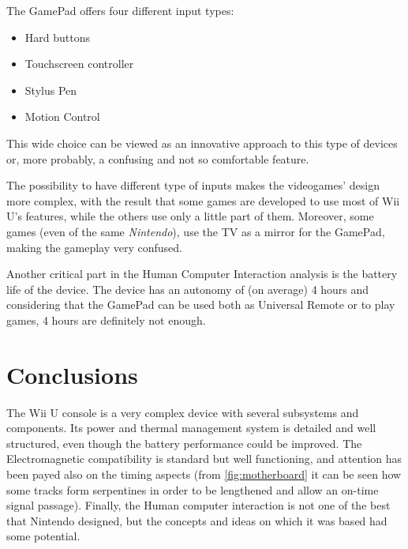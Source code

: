 \documentclass[11pt,a4paper,titlepage]{article}
\begin{document}
			The GamePad offers four different input types:
			\begin{itemize}
				\item Hard buttons
				\item Touchscreen controller
				\item Stylus Pen
				\item Motion Control
			\end{itemize}
			This wide choice can be viewed as an innovative approach to this type of devices or, more probably, a confusing and not so comfortable feature.

			The possibility to have different type of inputs makes the videogames' design more complex, with the result that some games are developed to use most of Wii U's features, while the others use only a little part of them. Moreover, some games (even of the same \textit{Nintendo}), use the TV as a mirror for the GamePad, making the gameplay very confused.

			Another critical part in the Human Computer Interaction analysis is the battery life of the device.
			The device has an autonomy of (on average) 4 hours and considering that the GamePad can be used both as Universal Remote or to play games, 4 hours are definitely not enough.
  \section{Conclusions}
    The Wii U console is a very complex device with several subsystems and components. Its power and thermal management system is detailed and well structured, even though the battery performance could be improved. The Electromagnetic compatibility is standard but well functioning, and attention has been payed also on the timing aspects (from \autoref{fig:motherboard} it can be seen how some tracks form serpentines in order to be lengthened and allow an on-time signal passage). Finally, the Human computer interaction is not one of the best that Nintendo designed, but the concepts and ideas on which it was based had some potential. 


\end{document}
